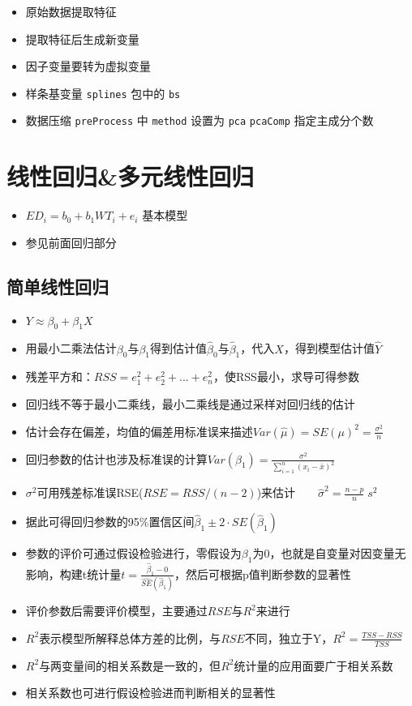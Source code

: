 \documentclass[]{book}
\providecommand{\tightlist}{%
  \setlength{\itemsep}{0pt}\setlength{\parskip}{0pt}}
\begin{document}
\begin{itemize}
\tightlist
\item
  原始数据提取特征
\item
  提取特征后生成新变量
\item
  因子变量要转为虚拟变量
\item
  样条基变量 \texttt{splines} 包中的 \texttt{bs}
\item
  数据压缩 \texttt{preProcess} 中 \texttt{method} 设置为 \texttt{pca} \texttt{pcaComp} 指定主成分个数
\end{itemize}

\section{线性回归\&多元线性回归}

\begin{itemize}
\tightlist
\item
  \(ED_i = b_0 + b_1 WT_i + e_i\) 基本模型
\item
  参见前面回归部分
\end{itemize}

\subsection{简单线性回归}

\begin{itemize}
\tightlist
\item
  \(Y \approx \beta_0 + \beta_1 X\)
\item
  用最小二乘法估计\(\beta_0\)与\(\beta_1\)得到估计值\(\hat \beta_0\)与\(\hat \beta_1\)，代入\(X\)，得到模型估计值\(\hat Y\)
\item
  残差平方和：\(RSS = e_1^2 + e_2^2 + ... + e_n^2\)，使RSS最小，求导可得参数
\item
  回归线不等于最小二乘线，最小二乘线是通过采样对回归线的估计
\item
  估计会存在偏差，均值的偏差用标准误来描述\(Var(\hat \mu) = SE(\mu)^2 = \frac{\sigma^2}{n}\)
\item
  回归参数的估计也涉及标准误的计算\(Var(\beta_{1}) = \frac{\sigma^2}{\sum_{i=1}^n{(x_i - \bar{x})^2}}\)
\item
  \(\sigma^2\)可用残差标准误RSE(\(RSE = RSS/(n − 2)\))来估计\(\qquad\hat\sigma^2 = \frac{n-p}{n}\;s^2\)
\item
  据此可得回归参数的95\%置信区间\(\hat \beta_1 ± 2 \cdot SE(\hat \beta_1)\)
\item
  参数的评价可通过假设检验进行，零假设为\(\beta_1\)为0，也就是自变量对因变量无影响，构建t统计量\(t = \frac{\hat \beta_1 - 0}{\hat {SE}(\hat \beta_1)}\)，然后可根据p值判断参数的显著性
\item
  评价参数后需要评价模型，主要通过\(RSE\)与\(R^2\)来进行
\item
  \(R^2\)表示模型所解释总体方差的比例，与\(RSE\)不同，独立于Y，\(R^2 = \frac{TSS - RSS}{TSS}\)
\item
  \(R^2\)与两变量间的相关系数是一致的，但\(R^2\)统计量的应用面要广于相关系数
\item
  相关系数也可进行假设检验进而判断相关的显著性
\end{itemize}
\end{document}
